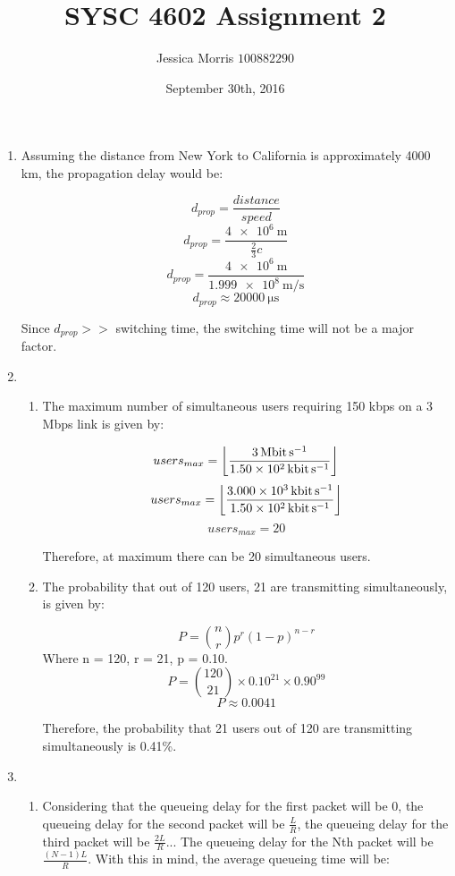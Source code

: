 \documentclass{article}
\title{SYSC 4602 Assignment 2}
\date{September 30th, 2016}
\author{Jessica Morris \(100882290\)}
\begin{document}
\maketitle

\begin{enumerate}

\item Assuming the distance from New York to California is approximately 4000 km, the propagation delay would be:

$$ d_{prop} = \frac{distance}{speed} $$
$$ d_{prop} = \frac{ \SI{4e6}{\metre} }{ \frac{2}{3} c } $$
$$ d_{prop} = \frac{ \SI{4e6}{\metre} }{ \SI{1.999e8}{\metre\per\second} } $$
$$ d_{prop} \approx \SI{20000}{\micro\second} $$

Since $ d_{prop} >> $ switching time, the switching time will not be a major factor.

\item
\begin{enumerate}

\item The maximum number of simultaneous users requiring 150 kbps on a 3 Mbps link is given by:

$$ users_{max} = \left \lfloor{\frac{\SI{3}{\mega\bit\per\second}}{\SI{150}{\kilo\bit\per\second}}} \right \rfloor $$
$$ users_{max} = \left \lfloor{\frac{\SI{3000}{\kilo\bit\per\second}}{\SI{150}{\kilo\bit\per\second}}} \right \rfloor $$
$$ users_{max} = 20 $$

Therefore, at maximum there can be 20 simultaneous users.

\item The probability that out of 120 users, 21 are transmitting simultaneously, is given by:

$$ P = { n \choose r } p^{r} (1-p)^{n-r} $$
Where n = 120, r = 21, p = 0.10.
$$ P = { 120 \choose 21 } \times 0.10^{21} \times 0.90^{99} $$
$$ P \approx 0.0041$$

Therefore, the probability that 21 users out of 120 are transmitting simultaneously is 0.41\%.

\end{enumerate}

\item
\begin{enumerate}

\item Considering that the queueing delay for the first packet will be $0$, the queueing delay for the second packet will be $\frac{L}{R}$, the queueing delay for the third packet will be $\frac{2L}{R}$... The queueing delay for the Nth packet will be $\frac{(N-1)L}{R}$. With this in mind, the average queueing time will be:


\end{enumerate}
\end{enumerate}
\end{document}
